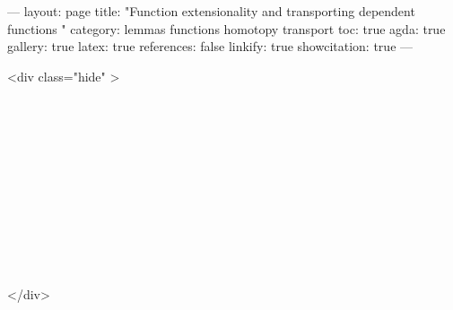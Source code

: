 ---
layout: page
title: "Function extensionality and transporting dependent functions "
category: lemmas functions homotopy transport
toc: true
agda: true
gallery: true
latex: true
references: false
linkify: true
showcitation: true
---

<div class="hide" >
\begin{code}%
\>[0]\AgdaSymbol{\{-\#}\AgdaSpace{}%
\AgdaSpace{}%
\AgdaSpace{}%
\AgdaSymbol{\#-\}}\<%
\\
\>[0]\AgdaSpace{}%
\AgdaModule{\AgdaUnderscore{}}\AgdaSpace{}%
\<%
\\
\>[0]\AgdaSpace{}%
\AgdaSpace{}%
\<%
\\
\>[0]\AgdaSpace{}%
\AgdaSpace{}%
\<%
\\
%
\\[\AgdaEmptyExtraSkip]%
\>[0]\AgdaSpace{}%
\AgdaSpace{}%
\<%
\\
%
\\[\AgdaEmptyExtraSkip]%
\>[0]\AgdaSpace{}%
\AgdaSpace{}%
\<%
\\
\>[0]\AgdaSpace{}%
\AgdaSpace{}%
\<%
\\
\>[0]\AgdaSpace{}%
\AgdaSpace{}%
\<%
\\
\>[0]\AgdaSpace{}%
\AgdaSpace{}%
\<%
\end{code}
</div>

\begin{code}%
\>[0]\<%
\\
\>[0][@{}l@{\AgdaIndent{0}}]%
\>[2]\<%
\\
%
\>[2]\AgdaSymbol{\{}\AgdaSpace{}%
\AgdaSymbol{:}\AgdaSpace{}%
\AgdaSpace{}%
\AgdaSymbol{\}}\AgdaSpace{}%
\AgdaSymbol{\{}\AgdaSpace{}%
\AgdaSymbol{:}\AgdaSpace{}%
\AgdaSpace{}%
\AgdaSpace{}%
\AgdaSpace{}%
\AgdaSymbol{\}\{}\AgdaSpace{}%
\AgdaSymbol{:}\AgdaSpace{}%
\AgdaSymbol{(}\AgdaSpace{}%
\AgdaSymbol{:}\AgdaSpace{}%
\AgdaSymbol{)}\AgdaSpace{}%
\AgdaSpace{}%
\AgdaSpace{}%
\AgdaSpace{}%
\AgdaSpace{}%
\AgdaSpace{}%
\AgdaSymbol{\}\{}\AgdaSpace{}%
\AgdaSpace{}%
\AgdaSymbol{:}\AgdaSpace{}%
\AgdaSymbol{\}}\<%
\\
%
\>[2]\<%
\end{code}

